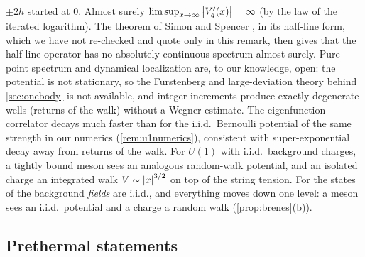 \begin{remark}
\begin{enumerate}[label=(\alph*)]
$\pm2h$ started at $0$.  Almost surely $\limsup_{x\to\infty}\left|V'_q(x)\right|=\infty$ (by the law of the iterated
logarithm).  The theorem of Simon and Spencer \cite{SimonSpencer1989}, in its half-line form, which we have not
re-checked and quote only in this remark, then gives that the half-line operator has no absolutely continuous
spectrum almost surely.  Pure point spectrum and dynamical localization are, to our knowledge, open: the potential is not
stationary, so the Furstenberg and large-deviation theory behind \cref{sec:onebody} is not available, and integer
increments produce exactly degenerate wells (returns of the walk) without a Wegner estimate.  The
eigenfunction correlator decays much faster than for the i.i.d.\ Bernoulli potential of the same strength in
our numerics (\cref{rem:u1numerics}), consistent with super-exponential decay away from returns of the walk.  For $U(1)$ with i.i.d.\ background charges,
a tightly bound meson sees an analogous random-walk potential, and an isolated charge an integrated walk
$V\sim\left|x\right|^{3/2}$ on top of the string tension.  For the states of \cite{Brenes2018} the background \emph{fields} are
i.i.d., and everything moves down one level: a meson sees an i.i.d.\ potential and a charge a random walk
(\cref{prop:brenes}(b)).
\end{enumerate}
\end{remark}

\subsection{Prethermal statements}\label{sec:u1:adhh}

